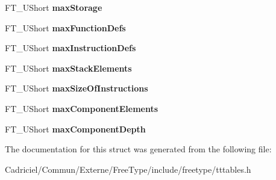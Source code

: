 \begin{DoxyCompactItemize}
\item 
F\+T\+\_\+\+U\+Short {\bfseries max\+Storage}\hypertarget{struct_t_t___max_profile___a502a8579e3d358f3c00776ed0cc8a168}{}\label{struct_t_t___max_profile___a502a8579e3d358f3c00776ed0cc8a168}

\item 
F\+T\+\_\+\+U\+Short {\bfseries max\+Function\+Defs}\hypertarget{struct_t_t___max_profile___acc24e822a62bbfaa86d36f691fcde60b}{}\label{struct_t_t___max_profile___acc24e822a62bbfaa86d36f691fcde60b}

\item 
F\+T\+\_\+\+U\+Short {\bfseries max\+Instruction\+Defs}\hypertarget{struct_t_t___max_profile___a3f7bd433baede417293415cf60f20d8f}{}\label{struct_t_t___max_profile___a3f7bd433baede417293415cf60f20d8f}

\item 
F\+T\+\_\+\+U\+Short {\bfseries max\+Stack\+Elements}\hypertarget{struct_t_t___max_profile___a2df9b9ff2a5a9daaa7c3d40fe024637f}{}\label{struct_t_t___max_profile___a2df9b9ff2a5a9daaa7c3d40fe024637f}

\item 
F\+T\+\_\+\+U\+Short {\bfseries max\+Size\+Of\+Instructions}\hypertarget{struct_t_t___max_profile___ac458411198b09d303ec8ae206e6926b6}{}\label{struct_t_t___max_profile___ac458411198b09d303ec8ae206e6926b6}

\item 
F\+T\+\_\+\+U\+Short {\bfseries max\+Component\+Elements}\hypertarget{struct_t_t___max_profile___a110e6d735610c6d8fd89221d03440c32}{}\label{struct_t_t___max_profile___a110e6d735610c6d8fd89221d03440c32}

\item 
F\+T\+\_\+\+U\+Short {\bfseries max\+Component\+Depth}\hypertarget{struct_t_t___max_profile___a9ae1f117c954e0711b03f1675d6191d9}{}\label{struct_t_t___max_profile___a9ae1f117c954e0711b03f1675d6191d9}

\end{DoxyCompactItemize}


The documentation for this struct was generated from the following file\+:\begin{DoxyCompactItemize}
\item 
Cadriciel/\+Commun/\+Externe/\+Free\+Type/include/freetype/tttables.\+h\end{DoxyCompactItemize}
